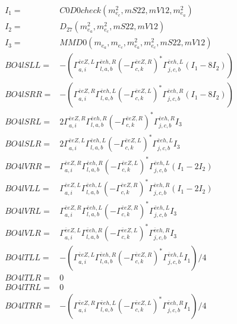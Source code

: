 \documentclass[A4,landscape]{article}
\begin{document}
\begin{align} 
I_1 = & C0D0check(m^2_{e_{{c}}}, mS22, mV12, m^2_{e_{{a}}}) \\ 
I_2 = & D_{27}(m^2_{e_{{a}}}, m^2_{e_{{c}}}, mS22, mV12) \\ 
I_3 = & MMD0(m_{e_{{a}}}, m_{e_{{c}}}, m^2_{e_{{a}}}, m^2_{e_{{c}}}, mS22, mV12) \\ 
  BO4lSLL= & -( \Gamma^{\bar{e}e Z ,L}_{a, i} \Gamma^{\bar{e}e h ,R}_{l, a, b} (- \Gamma^{\bar{e}e Z ,R} _{c, k})^* \Gamma^{\bar{e}e h ,L}_{j, c, b} (I_1 - 8 I_2)) \\ 
  BO4lSRR= & -( \Gamma^{\bar{e}e Z ,R}_{a, i} \Gamma^{\bar{e}e h ,L}_{l, a, b} (- \Gamma^{\bar{e}e Z ,L} _{c, k})^* \Gamma^{\bar{e}e h ,R}_{j, c, b} (I_1 - 8 I_2)) \\ 
  BO4lSRL= & 2  \Gamma^{\bar{e}e Z ,R}_{a, i} \Gamma^{\bar{e}e h ,R}_{l, a, b} (- \Gamma^{\bar{e}e Z ,R} _{c, k})^* \Gamma^{\bar{e}e h ,R}_{j, c, b} I_3 \\ 
  BO4lSLR= & 2  \Gamma^{\bar{e}e Z ,L}_{a, i} \Gamma^{\bar{e}e h ,L}_{l, a, b} (- \Gamma^{\bar{e}e Z ,L} _{c, k})^* \Gamma^{\bar{e}e h ,L}_{j, c, b} I_3 \\ 
  BO4lVRR= &  \Gamma^{\bar{e}e Z ,R}_{a, i} \Gamma^{\bar{e}e h ,R}_{l, a, b} (- \Gamma^{\bar{e}e Z ,L} _{c, k})^* \Gamma^{\bar{e}e h ,L}_{j, c, b} (I_1 - 2 I_2) \\ 
  BO4lVLL= &  \Gamma^{\bar{e}e Z ,L}_{a, i} \Gamma^{\bar{e}e h ,L}_{l, a, b} (- \Gamma^{\bar{e}e Z ,R} _{c, k})^* \Gamma^{\bar{e}e h ,R}_{j, c, b} (I_1 - 2 I_2) \\ 
  BO4lVRL= &  \Gamma^{\bar{e}e Z ,R}_{a, i} \Gamma^{\bar{e}e h ,L}_{l, a, b} (- \Gamma^{\bar{e}e Z ,R} _{c, k})^* \Gamma^{\bar{e}e h ,L}_{j, c, b} I_3 \\ 
  BO4lVLR= &  \Gamma^{\bar{e}e Z ,L}_{a, i} \Gamma^{\bar{e}e h ,R}_{l, a, b} (- \Gamma^{\bar{e}e Z ,L} _{c, k})^* \Gamma^{\bar{e}e h ,R}_{j, c, b} I_3 \\ 
  BO4lTLL= & -( \Gamma^{\bar{e}e Z ,L}_{a, i} \Gamma^{\bar{e}e h ,R}_{l, a, b} (- \Gamma^{\bar{e}e Z ,R} _{c, k})^* \Gamma^{\bar{e}e h ,L}_{j, c, b} I_1)/4 \\ 
  BO4lTLR= & 0 \\ 
  BO4lTRL= & 0 \\ 
  BO4lTRR= & -( \Gamma^{\bar{e}e Z ,R}_{a, i} \Gamma^{\bar{e}e h ,L}_{l, a, b} (- \Gamma^{\bar{e}e Z ,L} _{c, k})^* \Gamma^{\bar{e}e h ,R}_{j, c, b} I_1)/4 \\ 
\end{align} 
\end{document}

